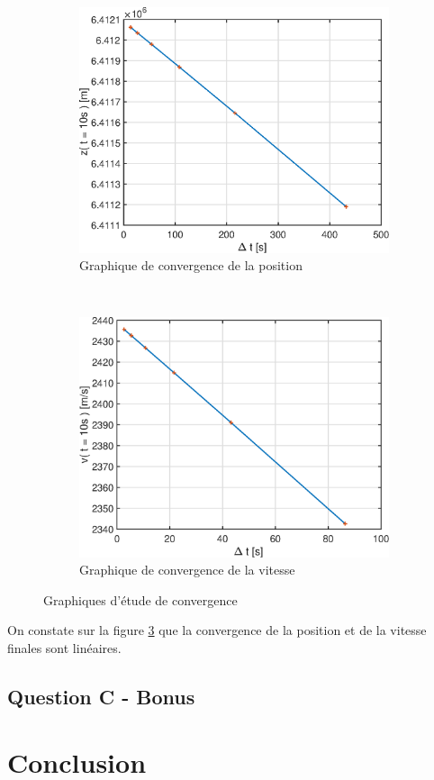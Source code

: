 \documentclass[a4paper,12pt,twoside]{article}
\begin{document}
\begin{figure}[h]
	\centering
	\begin{subfigure}[b]{0.45\textwidth}
		\includegraphics[width=\textwidth]{graphs/zConvB.eps}
		\caption{Graphique de convergence de la position}
		\label{fig:B-zConv}
	\end{subfigure}
	~
	\begin{subfigure}[b]{0.45\textwidth}
		\includegraphics[width=\textwidth]{graphs/vConvB.eps}
		\caption{Graphique de convergence de la vitesse}
		\label{fig:B-vConv}
	\end{subfigure}
	\caption{Graphiques d'étude de convergence}
	\label{fig:B-conv}
\end{figure}

On constate sur la figure \ref{fig:B-conv} que la convergence de la position et de la vitesse finales sont linéaires.

\subsection{Question C - Bonus}

\section{Conclusion}
\end{document}
